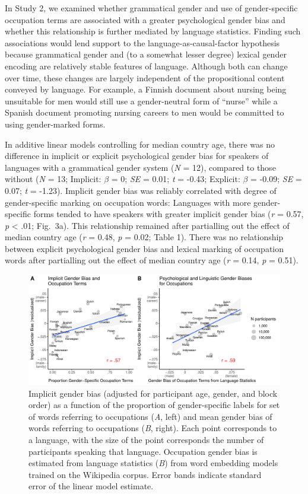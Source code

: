 \documentclass[9pt,twocolumn,twoside]{pnas-new}
\begin{document}
In Study 2, we examined whether grammatical gender and use of
gender-specific occupation terms are associated with a greater
psychological gender bias and whether this relationship is further
mediated by language statistics. Finding such associations would lend support to the language-as-causal-factor hypothesis because grammatical gender and (to a somewhat lesser degree) lexical gender encoding are relatively stable features of language. Although both can change over time, these changes are largely independent of the propositional content conveyed by language. For example, a Finnish document about nursing being unsuitable for men would still use a gender-neutral form of
\enquote{nurse} while a Spanish document promoting nursing careers to
men would be committed to using gender-marked forms.


In additive linear models controlling for median country age, there was
no difference in implicit or explicit psychological gender bias for
speakers of languages with a grammatical gender system (\emph{N} = 12),
compared to those without (\emph{N} = 13; Implicit: \(\beta\) = 0;
\emph{SE} = 0.01; \emph{t} = -0.43; Explicit: \(\beta\) = -0.09;
\emph{SE} = 0.07; \emph{t} = -1.23).  Implicit gender
bias was reliably correlated with degree of gender-specific marking on
occupation words: Languages with more gender-specific forms tended to
have speakers with greater implicit gender bias (\emph{r} = 0.57,
\emph{p} \textless{} .01; Fig.\ 3a). This relationship remained after partialling out the effect of
median country age (\emph{r} = 0.48, \emph{p} = 0.02; Table 1). There
was no relationship between explicit psychological gender bias and
lexical marking of occupation words after partialling out the effect of
median country age (\emph{r} = 0.14, \emph{p} = 0.51).

\begin{figure}[t!]
\centering
\includegraphics[width=17cm]{iatlang/pnas_rmd/iat_lang_pnas_files/figure-latex/study2_fig.pdf}
\caption{\label{fig:unnamed-chunk-15}Implicit gender bias (adjusted for participant age,
gender, and block order) as a function of the proportion of gender-specific labels for set of words referring to occupations ({\it A}, left) and  mean gender bias of words
referring to occupations ({\it B}, right). Each point corresponds to a language, with the size of the point corresponds the number of participants
speaking that language. Occupation gender bias is estimated from language statistics ({\it B}) from word embedding models trained on the
Wikipedia  corpus. Error bands indicate standard error of the
linear model estimate.}
\end{figure}
\end{document}
